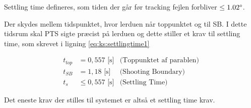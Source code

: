 Settling time defineres, som tiden der går før tracking fejlen forbliver \(\leq 1.02 \degree\).

Der skydes mellem tidspunktet, hvor lerduen når toppunktet og til SB.
I dette tidsrum skal PTS sigte præcist på lerduen og dette 
stiller et krav til settling time, som skrevet i ligning \ref{eq:ks:settlingtime1}

\begin{align}
  t_{top} &= 0,557\text{ [s]} &\text{(Toppunktet af parablen)}
  \label{eq:ks:toppunktstid}
  \\
   t_{SB} &= 1,18\text{ [s]} &\text{(Shooting Boundary)}
  \label{eq:ks:toppunktstid}
  \\
  t_{s} & \leq 0,557\text{ [s]} &\text{(Settling Time)}
  \label{eq:ks:settlingtime1}
\end{align}


Det eneste krav der stilles til systemet er altså et settling time krav.


